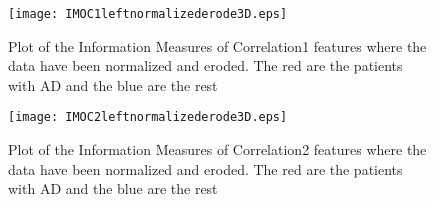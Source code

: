 \begin{figure}[H]
  \centering
  \texttt{[image: IMOC1leftnormalizederode3D.eps]}
  \caption{Plot of the Information Measures of Correlation1 features where the data have been normalized and eroded. The red are the patients with AD and the blue are the rest}\label{fig:IMOC1leftnormalizederode3D}
\end{figure}

\begin{figure}[H]
  \centering
  \texttt{[image: IMOC2leftnormalizederode3D.eps]}
  \caption{Plot of the Information Measures of Correlation2 features where the data have been normalized and eroded. The red are the patients with AD and the blue are the rest}\label{fig:IMOC2leftnormalizederode3D}
\end{figure}
